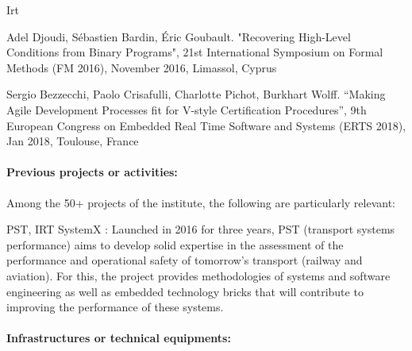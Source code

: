 \begin{sitedescription}{Irt}

\begin{compactitem}
\item Adel Djoudi, Sébastien Bardin, Éric Goubault. "Recovering High-Level Conditions from Binary Programs", 21st International Symposium on Formal Methods (FM 2016), November 2016, Limassol, Cyprus
\item Sergio Bezzecchi, Paolo Crisafulli, Charlotte Pichot, Burkhart Wolff. “Making Agile Development Processes fit for V-style Certification Procedures”, 9th European Congress on Embedded Real Time Software and Systems (ERTS 2018), Jan 2018, Toulouse, France
\end{compactitem}





\paragraph{Previous projects or activities:}


Among the 50+ projects of the institute, the following are particularly relevant:


\begin{compactitem}
\item PST, IRT SystemX : Launched in 2016 for three years, PST (transport systems performance) aims to develop solid expertise in the assessment of the performance and operational safety of tomorrow’s transport (railway and aviation). For this, the project provides methodologies of systems and software engineering as well as embedded technology bricks that will contribute to improving the performance of these systems.

\end{compactitem}






\paragraph{Infrastructures or technical equipments:}




\end{sitedescription}
